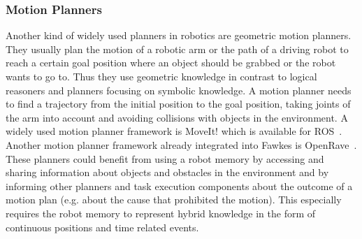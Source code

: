 \documentclass[a4paper,11pt]{article}
\begin{document}

\subsubsection{Motion Planners}
Another kind of widely used planners in robotics are geometric motion
planners. They usually plan the motion of a robotic arm or the path
of a driving robot to reach a certain goal position where an object
should be grabbed or the robot wants to go to. Thus they use geometric
knowledge in contrast to logical reasoners and planners focusing on
symbolic knowledge.
A motion planner needs to find a trajectory from the initial position to
the goal position, taking joints of the arm into account and avoiding
collisions with objects in the environment. A widely used motion
planner framework is MoveIt! which is available for ROS~\cite{MoveIt}.
Another motion planner framework already integrated into
Fawkes is OpenRave~\cite{OpenRave}. These planners could benefit from
using a robot memory by accessing and sharing information about
objects and obstacles in the environment and by informing other
planners and task execution components about the outcome of a motion
plan (e.g. about the cause that prohibited the motion). This
especially requires the robot memory to represent hybrid knowledge in
the form of continuous positions and time related events.
\end{document}
